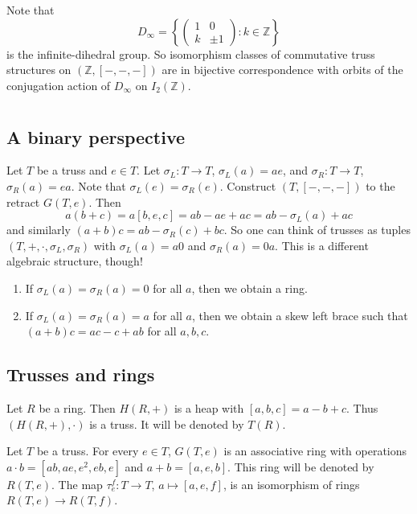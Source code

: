 \documentclass{svmult}
\newcommand{\Z}{\mathbb{Z}}
\begin{document}
Note that
\[
D_\infty=\left\{\begin{pmatrix}
1&0\\k&\pm 1
\end{pmatrix}:k\in\Z\right\}
\]
is the infinite-dihedral group. So isomorphism classes
of commutative truss structures on 
$\left(\Z,[-,-,-]\right)$ are in bijective correspondence with orbits of the conjugation 
action of $D_\infty$ on $I_2(\Z)$. 

\section{}

\subsection{A binary perspective}

Let $T$ be a truss and $e\in T$. Let $\sigma_L\colon T\to T$, $\sigma_L(a)=ae$, and 
$\sigma_R\colon T\to T$, $\sigma_R(a)=ea$. Note that $\sigma_L(e)=\sigma_R(e)$. 
Construct $\left(T,[-,-,-]\right)$ to the retract $G(T,e)$. Then
\[
a(b+c)=a[b,e,c]=ab-ae+ac=ab-\sigma_L(a)+ac
\]
and similarly $(a+b)c=ab-\sigma_R(c)+bc$. So one can think of trusses
as tuples $(T,+,\cdot,\sigma_L,\sigma_R)$ with 
$\sigma_L(a)=a0$ and $\sigma_R(a)=0a$. This is a different algebraic structure, though! 
\begin{enumerate}
    \item If $\sigma_L(a)=\sigma_R(a)=0$ for all $a$, then we obtain a ring. 
    \item If $\sigma_L(a)=\sigma_R(a)=a$ for all $a$, then we obtain a 
        skew left brace such that 
        $(a+b)c=ac-c+ab$ for all $a,b,c$.
\end{enumerate}

\subsection{Trusses and rings}

\begin{example}
    Let $R$ be a ring. Then $H(R,+)$ is a heap with $[a,b,c]=a-b+c$. Thus 
    $\left(H(R,+),\cdot\right)$ is a truss. It will be denoted by $T(R)$. 
\end{example}

\begin{theorem}
\label{thm:ring}
    Let $T$ be a truss. For every $e\in T$, $G(T,e)$ is an associative
    ring with operations $a\cdot b=[ab,ae,e^2,eb,e]$
    and $a+b=[a,e,b]$.
    This ring will be denoted by $R(T,e)$. 
    The map 
    $\tau_e^f\colon T\to T$, $a\mapsto [a,e,f]$, is an isomorphism of rings 
    $R(T,e)\to R(T,f)$. 
\end{theorem}
\end{document}
